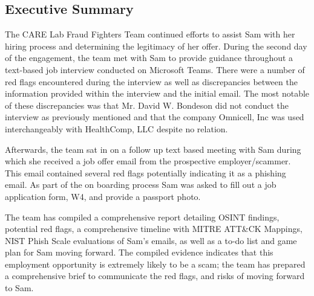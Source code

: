 \begin{fullwidth}
\section{Executive Summary}

The CARE Lab Fraud Fighters Team continued efforts to assist Sam with her hiring process and determining the legitimacy of her offer. During the second day of the engagement, the team met with Sam to provide guidance throughout a text-based job interview conducted on Microsoft Teams. There were a number of red flags encountered during the interview as well as discrepancies between the information provided within the interview and the initial email. The most notable of these discrepancies was that Mr. David W. Bondeson did not conduct the interview as previously mentioned and that the company Omnicell, Inc was used interchangeably with HealthComp, LLC despite no relation.\\\medskip

Afterwards, the team sat in on a follow up text based meeting with Sam during which she received a job offer email from the prospective employer/scammer. This email contained several red flags potentially indicating it as a phishing email. As part of the on boarding process Sam was asked to fill out a job application form, W4, and provide a passport photo.\\\medskip

The team has compiled a comprehensive report detailing OSINT findings, potential red flags, a comprehensive timeline with MITRE ATT\&CK Mappings, NIST Phish Scale evaluations of Sam's emails, as well as a to-do list and game plan for Sam moving forward. The compiled evidence indicates that this employment opportunity is extremely likely to be a scam; the team has prepared a comprehensive brief to communicate the red flags, and risks of moving forward to Sam.
\end{fullwidth}